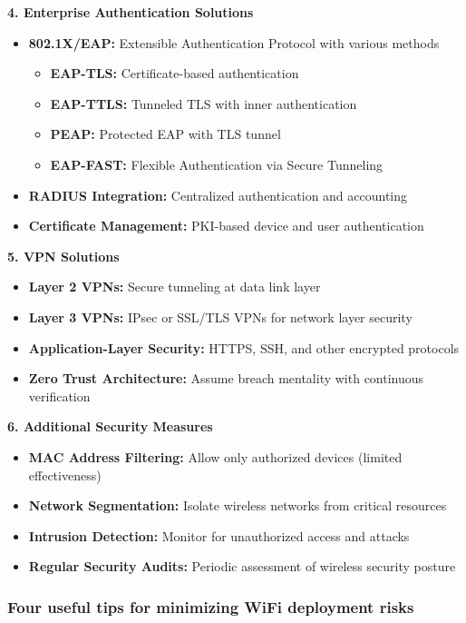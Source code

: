 \documentclass[12pt,a4paper]{article}
\begin{document}
\textbf{4. Enterprise Authentication Solutions}
\begin{itemize}
    \item \textbf{802.1X/EAP:} Extensible Authentication Protocol with various methods
    \begin{itemize}
        \item \textbf{EAP-TLS:} Certificate-based authentication
        \item \textbf{EAP-TTLS:} Tunneled TLS with inner authentication
        \item \textbf{PEAP:} Protected EAP with TLS tunnel
        \item \textbf{EAP-FAST:} Flexible Authentication via Secure Tunneling
    \end{itemize}
    \item \textbf{RADIUS Integration:} Centralized authentication and accounting
    \item \textbf{Certificate Management:} PKI-based device and user authentication
\end{itemize}

\textbf{5. VPN Solutions}
\begin{itemize}
    \item \textbf{Layer 2 VPNs:} Secure tunneling at data link layer
    \item \textbf{Layer 3 VPNs:} IPsec or SSL/TLS VPNs for network layer security
    \item \textbf{Application-Layer Security:} HTTPS, SSH, and other encrypted protocols
    \item \textbf{Zero Trust Architecture:} Assume breach mentality with continuous verification
\end{itemize}

\textbf{6. Additional Security Measures}
\begin{itemize}
    \item \textbf{MAC Address Filtering:} Allow only authorized devices (limited effectiveness)
    \item \textbf{Network Segmentation:} Isolate wireless networks from critical resources
    \item \textbf{Intrusion Detection:} Monitor for unauthorized access and attacks
    \item \textbf{Regular Security Audits:} Periodic assessment of wireless security posture
\end{itemize}

\subsubsection{Four useful tips for minimizing WiFi deployment risks}
\end{document}
